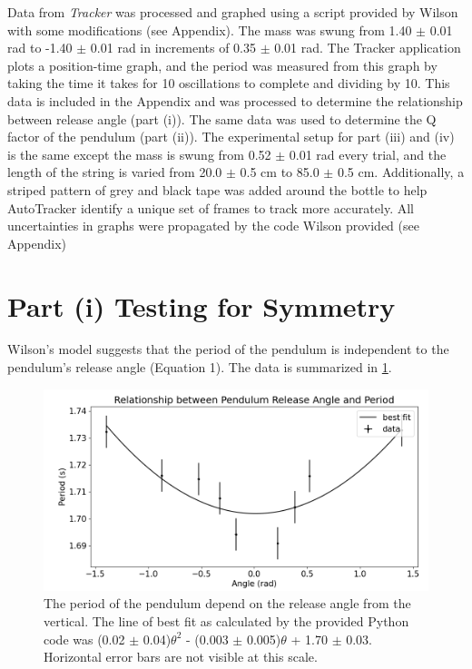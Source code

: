 \documentclass[notitlepage, twocolumn, 12pt]{article}
\begin{document}
    Data from \textit{Tracker} was processed and graphed using a script provided by Wilson with some modifications (see Appendix).
    The mass was swung from 1.40 $\pm$ 0.01 rad to -1.40 $\pm$ 0.01 rad in increments of 0.35 $\pm$ 0.01 rad. The Tracker application plots a position-time graph, and the period was measured from this graph by taking the time it takes for 10 oscillations to complete and dividing by 10. This data is included in the Appendix and was processed to determine the relationship between release angle (part (i)). The same data was used to determine the Q factor of the pendulum (part (ii)).
    The experimental setup for part (iii) and (iv) is the same except the mass is swung from 0.52 $\pm$ 0.01 rad every trial, and the length of the string is varied from 20.0 $\pm$ 0.5 cm to 85.0 $\pm$ 0.5 cm. Additionally, a striped pattern of grey and black tape was added around the bottle to help AutoTracker identify a unique set of frames to track more accurately. All uncertainties in graphs were propagated by the code Wilson provided (see Appendix) 

    \section*{Part (i) Testing for Symmetry}
    Wilson's model suggests that the period of the pendulum is independent to the pendulum's release angle (Equation 1). The data is summarized in \cref{fig:symmetryTest}.

    \begin{figure}[H]
        \includegraphics[width=\linewidth]{period_symmetry_revised.png}
        \caption{The period of the pendulum depend on the release angle from the vertical. The line of best fit as calculated by the provided Python code \cite{Wilson} was (0.02 $\pm$ 0.04)$\theta^2$ - (0.003 $\pm$ 0.005)$\theta$ + 1.70 $\pm$ 0.03. Horizontal error bars are not visible at this scale.}
        \label{fig:symmetryTest}
    \end{figure}
\end{document}
